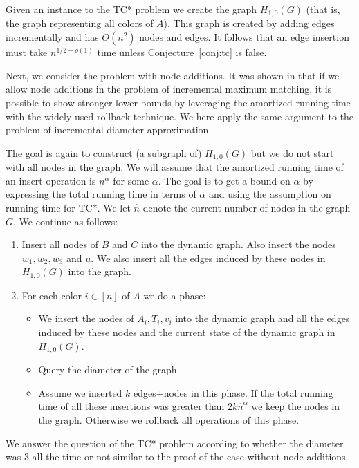 \documentclass[a4paper,11pt]{article}
\newcommand{\Ot}{\tilde{O}}
\theoremstyle{definition}
\begin{document}
Given an instance to the TC* problem we create the graph $H_{1,0}(G)$ (that is,
the graph representing all colors of $A$). This graph is created by adding
edges incrementally and has $\Ot(n^2)$ nodes and edges. It follows that an edge
insertion must take $n^{1/2-o(1)}$ time unless Conjecture~\ref{conj:tc} is
false.

Next, we consider the problem with node additions. It was shown in
\cite{KopelowitzPP16} that if we allow node additions in the problem of
incremental maximum matching, it is possible to show stronger lower bounds by
leveraging the amortized running time with the widely used rollback technique.
We here apply the same argument to the problem of incremental diameter
approximation.

The goal is again to construct (a subgraph of) $H_{1,0}(G)$ but we do not start
with all nodes in the graph. We will assume that the amortized
running time of an insert operation is $n^\alpha$ for some $\alpha$. The goal
is to get a bound on $\alpha$ by expressing the total running time in terms of
$\alpha$ and using the assumption on running time for TC*. We let $\hat{n}$
denote the current number of nodes in the graph $G$. We continue as follows:
\begin{enumerate}
    \item Insert all nodes of $B$ and $C$ into the dynamic graph. Also insert
        the nodes $w_1, w_2, w_3$ and $u$. We also insert all the edges
        induced by these nodes in $H_{1,0}(G)$ into the graph.
    \item For each color $i\in [n]$ of $A$ we do a phase:
        \begin{itemize}
            \item We insert the nodes of $A_i, T_i, v_i$ into the dynamic graph
                and all the edges induced by these nodes and the current state
                of the dynamic graph in $H_{1,0}(G)$.
            \item Query the diameter of the graph.
            \item Assume we inserted $k$ edges+nodes in this phase. If the
                total running time of all these insertions was greater than
                $2k\hat{n}^\alpha$ we keep the nodes in the graph. Otherwise we
                rollback all operations of this phase.
        \end{itemize}
\end{enumerate}
We answer the question of the TC* problem according to whether the diameter was
$3$ all the time or not similar to the proof of the case without
node additions.
\end{document}

